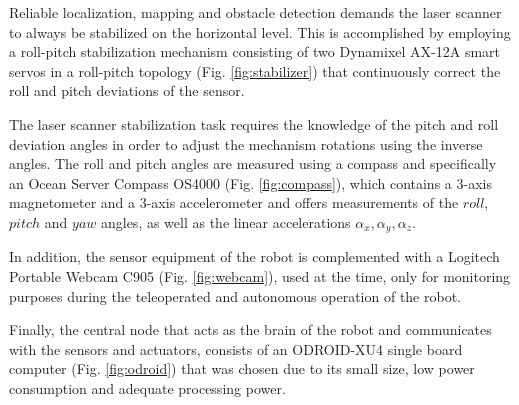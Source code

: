 \documentclass[conference]{IEEEtran}
\begin{document}
Reliable localization, mapping and obstacle detection demands the laser scanner to always be stabilized on the horizontal level. This is accomplished by employing a roll-pitch stabilization mechanism consisting of two Dynamixel AX-12A smart servos in a roll-pitch topology (Fig. \ref{fig:stabilizer}) that continuously correct the roll and pitch deviations of the sensor.

The laser scanner stabilization task requires the knowledge of the pitch and roll deviation angles in order to adjust the mechanism rotations using the inverse angles. The roll and pitch angles are measured using a compass and specifically an Ocean Server Compass OS4000 (Fig. \ref{fig:compass}), which contains a 3-axis magnetometer and a 3-axis accelerometer and offers measurements of the $roll$, $pitch$ and $yaw$ angles, as well as the linear accelerations $\alpha_x, \alpha_y, \alpha_z$.

In addition, the sensor equipment of the robot is complemented with a Logitech Portable Webcam C905 (Fig. \ref{fig:webcam}), used at the time, only for monitoring purposes during the teleoperated and autonomous operation of the robot.

Finally, the central node that acts as the brain of the robot and communicates with the sensors and actuators, consists of an ODROID-XU4 single board computer (Fig. \ref{fig:odroid}) that was chosen due to its small size, low power consumption and adequate processing power.
\end{document}
